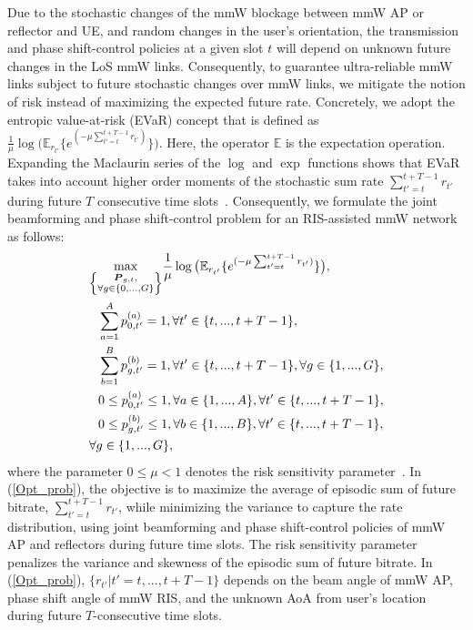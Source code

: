\documentclass[conference]{IEEEtran}
\begin{document}
Due to the stochastic changes of the mmW blockage between mmW AP or reflector and UE, and random changes in the user's orientation, the transmission and phase shift-control policies at a given slot $t$ will depend on unknown future changes in the LoS mmW links. Consequently, to guarantee ultra-reliable mmW links subject to future stochastic changes over mmW links, we mitigate the notion of risk instead of maximizing the expected future rate. Concretely, we adopt the entropic value-at-risk (EVaR) concept that is defined as $\frac{1}{\mu} \log\big( \mathbb{E}_{{r}_{t'}} \{e^{(-\mu \sum_{t'=t}^{t+T-1} {r}_{t'})}\} \big)$\cite{five}. Here, the operator $\mathbb{E}$ is the expectation operation. Expanding the Maclaurin series of the $\log$ and $\exp$ functions shows that EVaR takes into account higher order moments of the stochastic sum rate $\sum_{t'=t}^{t+T-1} {r}_{t'}$ during future $T$ consecutive time slots~\cite{four}. Consequently, we formulate the joint beamforming and phase shift-control problem for an RIS-assisted mmW network as follows:
\begin{align}
& \underset{\left\{
\substack{\boldsymbol{P}_{g,t},\\
\forall g \in \{0,...,G\}
}
\right\}}
\max \frac{1}{\mu} \log\big( \mathbb{E}_{{r}_{t'}} \{e^{(-\mu \sum_{t'=t}^{t+T-1} {r}_{t'})}\} \big), \label{Opt_prob}\\
& \hspace{0.1in} \sum_{a=1}^{A} p_{0,t'}^{(a)} = 1, \forall t' \in \{t,...,t+T-1\}, \label{Opt_prob_c1}\\
& \hspace{0.1in} \sum_{b=1}^{B} p_{g,t'}^{(b)} = 1, \forall t' \in \{t,...,t+T-1\},\forall g \in \{1,...,G\}, \label{Opt_prob_c2}\\
& \hspace{0.1in} 0\leq p_{0,t'}^{(a)} \leq 1, \forall a \in \{1,...,A\},\forall t' \in \{t,...,t+T-1\},\label{Opt_prob_c3}\\
& \hspace{0.1in} 0\leq p_{g,t'}^{(b)} \leq 1, \forall b \in \{1,...,B\},\forall t' \in \{t,...,t+T-1\},\nonumber \\ &
\forall g \in \{1,...,G\}, \label{Opt_prob_c4}
\end{align}
where the parameter $0 \leq \mu < 1$ denotes the risk sensitivity parameter~\cite{four}. In (\ref{Opt_prob}), the objective is to maximize the average of episodic sum of future bitrate, $\sum_{t'=t}^{t+T-1} {r}_{t'}$, while minimizing the variance to capture the rate distribution, using joint beamforming and phase shift-control policies of mmW AP and reflectors during future time slots. The risk sensitivity parameter penalizes the variance and skewness of the episodic sum of future bitrate. In (\ref{Opt_prob}),  $\{{r}_{t'}|t'=t,...,t+T-1\}$ depends on the beam angle of mmW AP, phase shift angle of mmW RIS, and the unknown AoA from user's location during future $T$-consecutive time slots.
\end{document}
